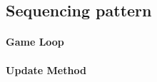 \subsection{Sequencing pattern}\label{ssec:SequencingPattern}

\paragraph{Game Loop}

\paragraph{Update Method}

